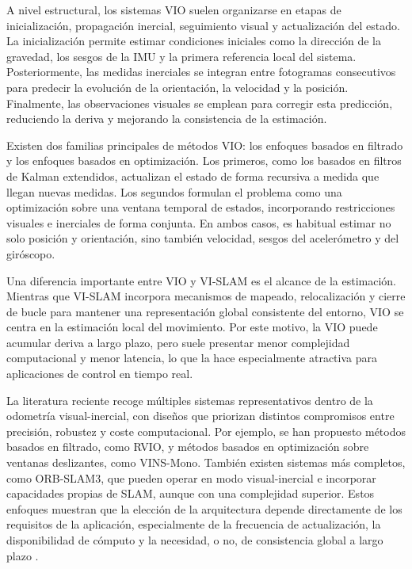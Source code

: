     A nivel estructural, los sistemas VIO suelen organizarse en etapas de inicialización, propagación inercial, seguimiento visual y actualización
    del estado. La inicialización permite estimar condiciones iniciales como la dirección de la gravedad, los sesgos de la IMU y la primera
    referencia local del sistema. Posteriormente, las medidas inerciales se integran entre fotogramas consecutivos para predecir la evolución de
    la orientación, la velocidad y la posición. Finalmente, las observaciones visuales se emplean para corregir esta predicción, reduciendo la
    deriva y mejorando la consistencia de la estimación.

    Existen dos familias principales de métodos VIO: los enfoques basados en filtrado y los enfoques basados en optimización. Los primeros, como
    los basados en filtros de Kalman extendidos, actualizan el estado de forma recursiva a medida que llegan nuevas medidas. Los segundos formulan
    el problema como una optimización sobre una ventana temporal de estados, incorporando restricciones visuales e inerciales de forma conjunta.
    En ambos casos, es habitual estimar no solo posición y orientación, sino también velocidad, sesgos del acelerómetro y del giróscopo.

    Una diferencia importante entre VIO y VI-SLAM es el alcance de la estimación. Mientras que VI-SLAM incorpora mecanismos de mapeado,
    relocalización y cierre de bucle para mantener una representación global consistente del entorno, VIO se centra en la estimación local del
    movimiento. Por este motivo, la VIO puede acumular deriva a largo plazo, pero suele presentar menor complejidad computacional y menor latencia,
    lo que la hace especialmente atractiva para aplicaciones de control en tiempo real.

    La literatura reciente recoge múltiples sistemas representativos dentro de la odometría visual-inercial, con diseños que priorizan distintos
    compromisos entre precisión, robustez y coste computacional. Por ejemplo, se han propuesto métodos basados en filtrado, como RVIO, y métodos
    basados en optimización sobre ventanas deslizantes, como VINS-Mono. También existen sistemas más completos, como ORB-SLAM3, que pueden operar
    en modo visual-inercial e incorporar capacidades propias de SLAM, aunque con una complejidad superior. Estos enfoques muestran que la elección
    de la arquitectura depende directamente de los requisitos de la aplicación, especialmente de la frecuencia de actualización, la disponibilidad
    de cómputo y la necesidad, o no, de consistencia global a largo plazo \cite{overview-vslam}.
    
